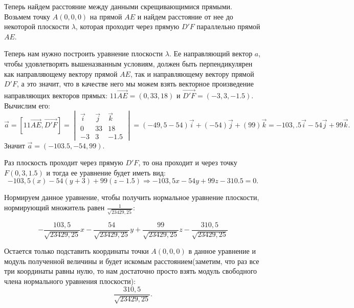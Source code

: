 	Теперь найдем расстояние между данными скрещивающимися прямыми. \\
	Возьмем точку $A(0,0,0)$ на прямой $AE$ и найдем расстояние от нее до некоторой плоскости $\lambda$, которая проходит через прямую $D'F$ параллельно прямой $AE$.
	
	Теперь нам нужно построить уравнение плоскости $\lambda$. Ее направляющий вектор $a$, чтобы удовлетворять вышеназванным условиям, должен быть перпендикулярен как направляющему вектору прямой $AE$, так и направляющему вектору прямой $D'F$, а это значит, что в качестве него мы можем взять векторное произведение направляющих векторов прямых: $11\overrightarrow{AE} = (0,33,18)$ и $\overrightarrow{D'F} = (-3,3,-1.5)$. Вычислим его:
	\[
		\vec{a} = [11\overrightarrow{AE}, \overrightarrow{D'F}] = 
		\begin{vmatrix}
		\vec i & \vec j & \vec k \\
		0 & 33 & 18 \\
		-3 & 3 & -1.5
		\end{vmatrix} = (-49,5 - 54)\vec i + (-54)\vec j + (99)\vec k = -103,.5 \vec i - 54 \vec j + 99 \vec k.
	\]
	Значит $\vec a = (-103.5, -54, 99)$.
	
	Раз плоскость проходит через прямую $D'F$, то она проходит и через точку $F(0, 3, 1.5)$ и тогда ее уравнение будет иметь вид: 
	\[
		-103,5(x) -54(y + 3) + 99(z - 1.5) \Rightarrow -103,5x - 54y + 99z -310.5 = 0.
	\]
	
	Нормируем данное уравнение, чтобы получить нормальное уравнение плоскости, нормирующий множитель равен $\frac{1}{\sqrt{23429,25}}$:
	
	\[
		-\frac{103,5}{\sqrt{23429,25}}x - \frac{54}{\sqrt{23429,25}}y + \frac{99}{\sqrt{23429,25}}z - \frac{310,5}{\sqrt{23429,25}}
	\]
	
	Остается только подставить координаты точки $A(0,0,0)$ в данное уравнение и модуль полученной величины и будет искомым расстоянием(заметим, что раз все три координаты равны нулю, то нам достаточно просто взять модуль свободного члена нормального уравнения плоскости): 
	\[
		\frac{310,5}{\sqrt{23429,25}}.
	\]

	